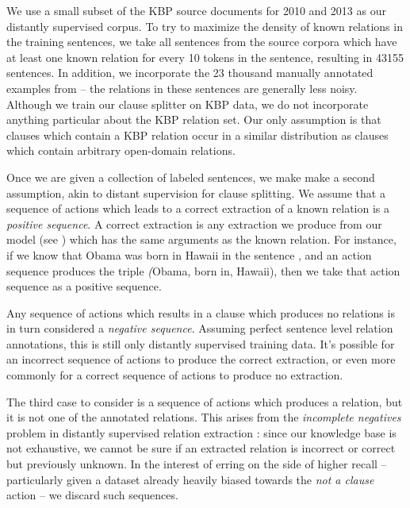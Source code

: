 We use a small subset of the KBP source documents for 
  2010 \cite{key:2010ji-kbpoverview}
  and 2013 \cite{key:2013surdeanu-kbpoverview}
  as our distantly supervised corpus.
To try to maximize the density of known relations in the training sentences,
  we take all sentences from the source corpora which have at least one known
  relation for every 10 tokens in the sentence,
  resulting in \num{43155} sentences.
In addition, we incorporate the 23 thousand manually annotated examples
  from  -- the relations in these sentences
  are generally less noisy.
Although we train our clause splitter on KBP data, we do not incorporate
  anything particular about the KBP relation set.
Our only assumption is that clauses which contain a KBP relation occur in
  a similar distribution as clauses which contain arbitrary open-domain
  relations.

Once we are given a collection of labeled sentences, we make make a second
  assumption, akin to distant supervision for clause splitting.
We assume that a sequence of actions which leads to a correct extraction of
  a known relation is a \textit{positive sequence}.
A correct extraction is any extraction we produce from our model
  (see ) which has the same arguments as the known
  relation.
For instance, if we know that Obama was born in Hawaii in the sentence
  , and an action sequence produces the triple
  \textit(Obama, born in, Hawaii), then we take that action sequence as
  a positive sequence.

Any sequence of actions which results in a clause which produces no relations
  is in turn considered a \textit{negative sequence}.
Assuming perfect sentence level relation annotations, this is still only
  distantly supervised training data.
It's possible for an incorrect sequence of actions to produce the correct
  extraction, or even more commonly for a correct sequence of actions to 
  produce no extraction.

The third case to consider is a sequence of actions which produces a relation,
  but it is not one of the annotated relations.
This arises from the \textit{incomplete negatives} problem in distantly
  supervised relation extraction \cite{key:2013min-incomplete}: 
  since our knowledge base is not exhaustive,
  we cannot be sure if an extracted relation is incorrect or correct but
  previously unknown.
In the interest of erring on the side of higher recall -- particularly given
  a dataset already heavily biased towards the \textit{not a clause} action --
  we discard such sequences.

